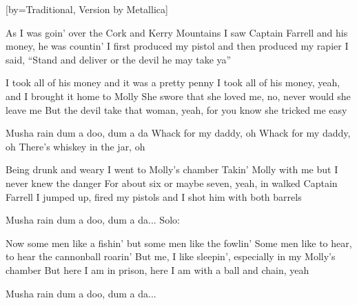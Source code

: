 
[by={Traditional, Version by Metallica}]

\chordson

\beginverse
As I was goin' over the Cork and Kerry Mountains
I saw Captain Farrell and his money, he was countin'
I first produced my pistol and then produced my rapier
I said, ``Stand and deliver or the devil he may take ya''
\endverse

\beginverse
I took all of his money and it was a pretty penny
I took all of his money, yeah, and I brought it home to Molly
She swore that she loved me, no, never would she leave me
But the devil take that woman, yeah, for you know she tricked me easy
\endverse

\beginchorus
Musha rain dum a doo, dum a da
Whack for my daddy, oh
Whack for my daddy, oh
There's whiskey in the jar, oh
\endchorus

\beginverse
Being drunk and weary I went to Molly's chamber
Takin' Molly with me but I never knew the danger
For about six or maybe seven, yeah, in walked Captain Farrell
I jumped up, fired my pistols and I shot him with both barrels
\endverse

\beginchorus
Musha rain dum a doo, dum a da...
Solo:
\endchorus

\beginverse
Now some men like a fishin' but some men like the fowlin'
Some men like to hear, to hear the cannonball roarin'
But me, I like sleepin', especially in my Molly's chamber
But here I am in prison, here I am with a ball and chain, yeah
\endverse

\beginchorus
Musha rain dum a doo, dum a da...
\endchorus


\endsong